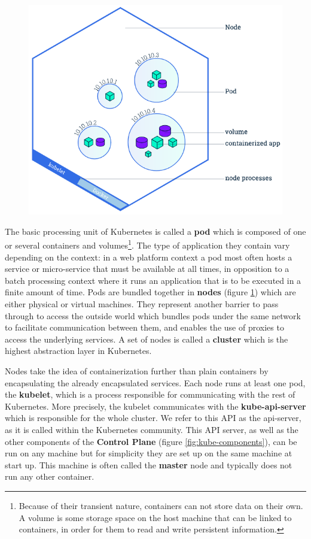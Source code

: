 \begin{figure}[h]
	\centering
	\includegraphics[scale=0.5]{./imgs/node-overview.png}
	\label{fig:node-overview}
\end{figure}

The basic processing unit of Kubernetes is called a \textbf{pod} which is
composed of one or several containers and volumes\footnote{Because of their
	transient nature, containers can not store data on their own. A volume
	is some storage space on the host machine that can be linked to
containers, in order for them to read and write persistent information.}. The
type of application they contain vary depending on the context: in a web
platform context a pod most often hosts a service or micro-service that must be
available at all times, in opposition to a batch processing context where it
runs an application that is to be executed in a finite amount of time.  Pods
are bundled together in \textbf{nodes} (figure \ref{fig:node-overview}) which
are either physical or virtual machines. They represent another barrier to pass
through to access the outside world which bundles pods under the same network
to facilitate communication between them, and enables the use of proxies to
access the underlying services. A set of nodes is called a \textbf{cluster}
which is the highest abstraction layer in Kubernetes.

Nodes take the idea of containerization further than plain containers by
encapsulating the already encapsulated services.  Each node runs at least one
pod, the \textbf{kubelet}, which is a process responsible for communicating
with the rest of Kubernetes. More precisely, the kubelet communicates with the
\textbf{kube-api-server} which is responsible for the whole cluster. We refer
to this API as the api-server, as it is called within the Kubernetes community.
This API server, as well as the other components of the \textbf{Control Plane}
(figure \ref{fig:kube-components}), can be run on any machine but for
simplicity they are set up on the same machine at start up. This machine is
often called the \textbf{master} node and typically does not run any other
container.

